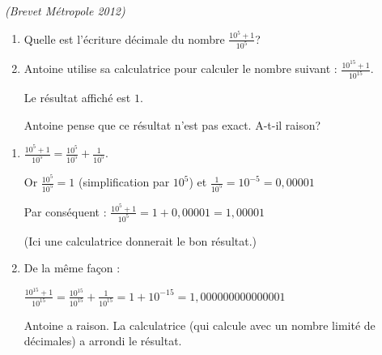 
\textit{(Brevet Métropole 2012)}
\begin{enumerate}
     \item
     Quelle est l'écriture décimale du nombre $\frac{10^{5}+1}{10^{5}}$?
     \item
     Antoine utilise sa calculatrice pour calculer le nombre suivant : $\frac{10^{15} +1}{10^{15}}$.
     \par
     Le résultat affiché est $1$.
     \par
     Antoine pense que ce résultat n'est pas exact. A-t-il raison?
\end{enumerate}
\begin{corrige}
     \begin{enumerate}
          \item
          $\frac{10^{5}+1}{10^{5}}=\frac{10^{5}}{10^{5}}+\frac{1}{10^{5}}$.
          \par
          Or  $\frac{10^{5}}{10^{5}}=1$ (simplification par $10^{5}$) et $\frac{1}{10^{5}}=10^{-5}=0,00001$
          \par
          Par conséquent :  $\frac{10^{5}+1}{10^{5}}=1+0,00001=1,00001$
          \par
          (Ici une calculatrice donnerait le bon résultat.)
          \item
          De la même façon :
          \par
          $\frac{10^{15}+1}{10^{15}}=\frac{10^{15}}{10^{15}}+\frac{1}{10^{15}}=1+10^{-15}=1,000000000000001$
          \par
          Antoine a raison. La calculatrice (qui calcule avec un nombre limité de décimales) a arrondi le résultat.
     \end{enumerate}
\end{corrige}

